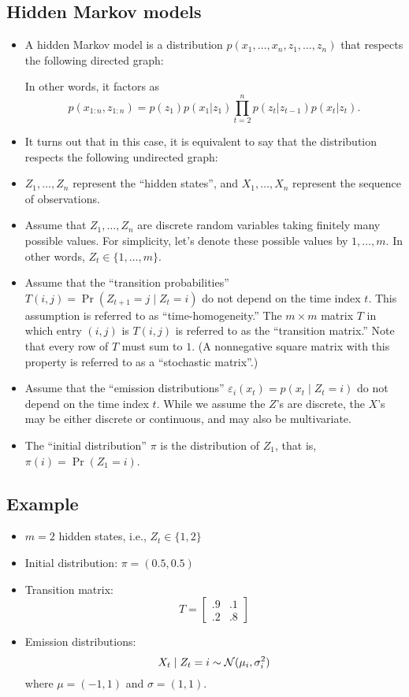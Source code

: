 \documentclass[12pt]{article}
\begin{document}
\subsection{Hidden Markov models}
\begin{itemize}
\item A hidden Markov model is a distribution $p(x_1,\ldots,x_n,z_1,\ldots,z_n)$ that respects the following directed graph:

In other words, it factors as
$$ p(x_{1:n},z_{1:n}) =p(z_1) p(x_1 | z_1) \prod_{t = 2}^n p(z_ t | z_{t -1}) p(x_t | z_t). $$
\item It turns out that in this case, it is equivalent to say that the distribution respects the following undirected graph:

\item $Z_1,\ldots,Z_n$ represent the ``hidden states'', and $X_1,\ldots,X_n$ represent the sequence of observations.
\item Assume that $Z_1,\ldots,Z_n$ are discrete random variables taking finitely many possible values. For simplicity, let's denote these possible values by $1,\ldots,m$. In other words, $Z_t \in \{1,\ldots,m \}$.
\item Assume that the ``transition probabilities'' $T(i,j) = \Pr(Z_{t +1} = j \mid Z_t = i)$ do not depend on the time index $t$. This assumption is referred to as ``time-homogeneity.'' The $m \times m$  matrix $T$ in which entry $(i,j)$ is $T(i,j)$ is referred to as the ``transition matrix.'' Note that every row of $T$ must sum to $1$. (A nonnegative square matrix with this property is referred to as a ``stochastic matrix''.)
\item Assume that the ``emission distributions'' $\varepsilon_i(x_t) = p(x_t \mid Z_t = i)$ do not depend on the time index $t$. While we assume the $Z$'s are discrete, the $X$'s may be either discrete or continuous, and may also be multivariate.
\item The ``initial distribution'' $\pi$ is the distribution of $Z_1$, that is, $\pi(i) = \Pr(Z_1 = i)$.
\end{itemize}

\subsection{Example}
\begin{itemize}
\item $m = 2$ hidden states, i.e., $Z_t \in \{1,2 \}$
\item Initial distribution: $\pi = (0.5, 0.5)$
\item Transition matrix:
$$ T = \begin{bmatrix}.9 & .1\\.2 & .8 \end{bmatrix} $$
\item Emission distributions: 
$$X_t \mid Z_t = i \sim \mathcal{N}(\mu_i,\sigma_i^2)$$
where $\mu = (-1,1)$ and $\sigma = (1,1)$.
\end{itemize}
\end{document}
